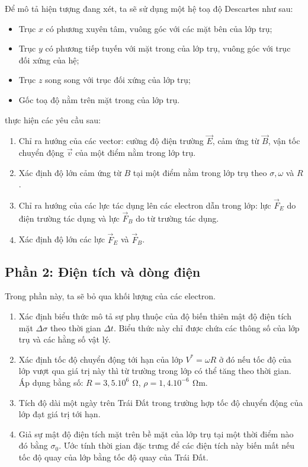 \noindent Để mô tả hiện tượng đang xét, ta sẽ sử dụng một hệ toạ độ Descartes như sau:
\begin{itemize}
  \item Trục $x$ có phương xuyên tâm, vuông góc với các mặt bên của lớp trụ;
  \item Trục $y$ có phương tiếp tuyến với mặt trong của lớp trụ, vuông góc với trục đối xứng của hệ;
  \item Trục $z$ song song với trục đối xứng của lớp trụ;
  \item Gốc toạ độ nằm trên mặt trong của lớp trụ.
\end{itemize}
thực hiện các yêu cầu sau:
\begin{enumerate}
  \item Chỉ ra hướng của các vector: cường độ điện trường $\vec{E}$, cảm ứng từ $\vec{B}$, vận tốc chuyển động $\vec{v}$ của một điểm nằm trong lớp trụ.
  \item Xác định độ lớn cảm ứng từ $B$ tại một điểm nằm trong lớp trụ theo $\sigma,\omega$ và $R$.
  \item Chỉ ra hướng của các lực tác dụng lên các electron dẫn trong lớp: lực $\vec{F}_{E}$ do điện trường tác dụng và lực $\vec{F}_{B}$ do từ trường tác dụng.
  \item Xác định độ lớn các lực $\vec{F}_{E}$ và $\vec{F}_{B}$.
\end{enumerate}

\subsection*{Phần 2: Điện tích và dòng điện}
\noindent Trong phần này, ta sẽ bỏ qua khối lượng của các electron.
\begin{enumerate}
  \item Xác định biểu thức mô tả sự phụ thuộc của độ biến thiên mật độ điện tích mặt $\Delta\sigma$ theo thời gian $\Delta t$. Biểu thức này chỉ được chứa các thông số của lớp trụ và các hằng số vật lý.
  \item Xác định tốc độ chuyển động tới hạn của lớp $V^{*}=\omega R$ ở đó nếu tốc độ của lớp vượt qua giá trị này thì từ trường trong lớp có thể tăng theo thời gian. Áp dụng bằng số: $R=3,5.10^{6}\,\SI{}{\ohm}$, $\rho=1,4.10^{-6}\,\SI{}{\ohm\metre}$.
  \item Tích độ dài một ngày trên Trái Đất trong trường hợp tốc độ chuyển động của lớp đạt giá trị tới hạn.
  \item Giả sự mật độ điện tích mặt trên bề mặt của lớp trụ tại một thời điểm nào đó bằng $\sigma_{0}$. Ước tính thời gian đặc trưng để các điện tích này biến mất nếu tốc độ quay của lớp bằng tốc độ quay của Trái Đất.
\end{enumerate}

